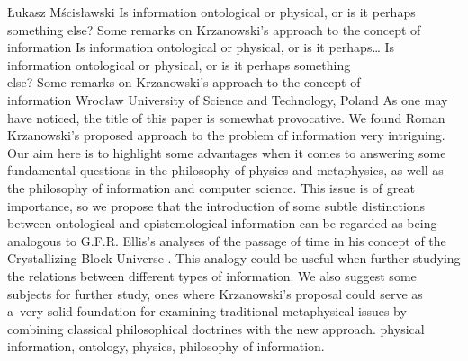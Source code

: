 \begin{artengenv}{Łukasz Mścisławski}
	{Is information ontological or physical, or is it perhaps something else? Some remarks on Krzanowski's approach to the concept of information}
	{Is information ontological or physical, or is it perhaps\ldots}
	{Is information ontological or physical, or is it perhaps something\\else? Some remarks on Krzanowski's approach to the concept of\\information}
	{Wrocław University of Science and Technology, Poland}
	{\label{mscislaw_start}As one may have noticed, the title of this paper is somewhat provocative. We found Roman Krzanowski's
	\parencites*[][]{krzanowski_does_2020}[][]{krzanowski_what_2020}[][]{krzanowski_why_2020}[][]{krzanowski_ontological_2022} %
	 proposed approach to the problem of information very intriguing. Our aim here is to highlight some advantages when it comes to answering some fundamental questions in the philosophy of physics and metaphysics, as well as the philosophy of information and computer science. This issue is of great importance, so we propose that the introduction of some subtle distinctions between ontological and epistemological information can be regarded as being analogous to G.F.R. Ellis's analyses of the passage of time in his concept of the Crystallizing Block Universe 
	\parencite[][]{ellis_space_2012}. %
	 This analogy could be useful when further studying the relations between different types of information. We also suggest some subjects for further study, ones where Krzanowski's proposal could serve as a~very solid foundation for examining traditional metaphysical issues by combining classical philosophical doctrines with the new approach.
	}
	{physical information, ontology, physics, philosophy of information.}



\end{artengenv}
